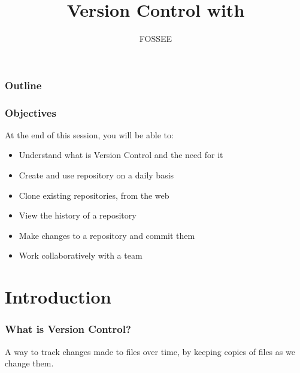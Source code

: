 \documentclass[14pt,compress]{beamer}
\title[Git]{Version Control with \typ{Git}}
\author[FOSSEE] {FOSSEE}
\institute[IIT Bombay] {Department of Aerospace Engineering\\IIT Bombay}
\date[]{}
\newcounter{time}
\begin{document}
\begin{frame}
  \maketitle
\end{frame}

\begin{frame}
  \frametitle{Outline}
  \tableofcontents
\end{frame}

\begin{frame}
  \frametitle{Objectives}
  At the end of this session, you will be able to:
  \begin{itemize}
  \item Understand what is Version Control and the need for it
  \item Create and use repository on a daily basis
  \item Clone existing repositories, from the web
  \item View the history of a repository
  \item Make changes to a repository and commit them
  \item Work collaboratively with a team
  \end{itemize}
\end{frame}


\section{Introduction}

\begin{frame}
  \frametitle{What is Version Control?}
  \begin{block}{}
    A way to track changes made to files over time, by keeping copies
    of files as we change them.
  \end{block}
\end{frame}
\end{document}
